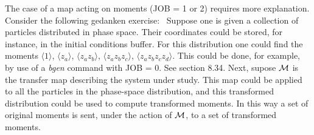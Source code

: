 The case of a map acting on moments (JOB = 1 or 2) requires more explanation.  Consider the following gedanken exercise: \ Suppose one is given a collection of particles distributed in phase space.  Their coordinates could be stored, for instance, in the initial conditions buffer.  For this distribution one could find the moments $\langle 1\rangle$, $\langle z_a\rangle$, $\langle z_az_b\rangle$, $\langle z_az_bz_c\rangle$, $\langle z_az_bz_cz_d\rangle$.  This could be done, for example, by use of a {\em bgen} command with JOB = 0.  See section 8.34.  Next, supose ${\cal M}$ is the transfer map describing the system under study.  This map could be applied to all the particles in the phase-space distribution, and this transformed distribution could be used to compute transformed moments.  In this way a set of original moments is sent, under the action of ${\cal M}$, to a set of transformed moments.

